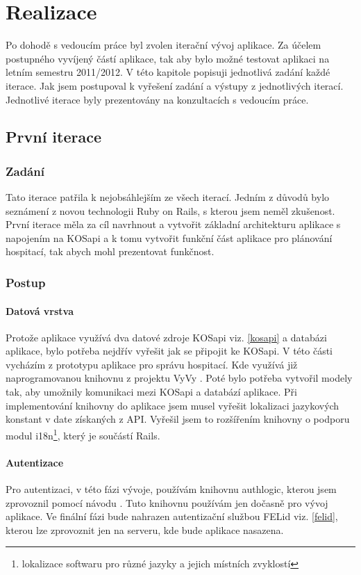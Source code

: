 \chapter{Realizace}
Po dohodě s vedoucím práce byl zvolen iterační vývoj aplikace. Za účelem postupného vyvíjený částí aplikace, tak aby bylo možné testovat aplikaci na letním semestru 2011/2012. V této kapitole popisuji jednotlivá zadání každé iterace. Jak jsem postupoval k vyřešení zadání a výstupy z jednotlivých iterací. Jednotlivé iterace byly prezentovány na konzultacích s vedoucím práce.

\section{První iterace}
\subsection{Zadání}
Tato iterace patřila k nejobsáhlejším ze všech iterací. Jedním z důvodů bylo  seznámení z novou technologii Ruby on Rails, s kterou jsem neměl zkušenost. První iterace měla za cíl navrhnout a vytvořit základní architekturu aplikace s napojením na KOSapi \cite{kosapi} a k tomu vytvořit funkční část aplikace pro plánování hospitací, tak abych mohl prezentovat funkčnost.

\subsection{Postup}
\subsubsection{Datová vrstva}
Protože aplikace využívá dva datové zdroje KOSapi viz. \ref{kosapi} a databázi aplikace, bylo potřeba nejdřív vyřešit jak se připojit ke KOSapi. V této části vycházím z prototypu aplikace pro správu hospitací. Kde využívá již naprogramovanou knihovnu z projektu VyVy \cite{vyvy}. Poté bylo potřeba vytvořil modely tak, aby umožnily komunikaci mezi KOSapi a databází aplikace. Při implementování knihovny do aplikace jsem musel vyřešit lokalizaci jazykových konstant v date získaných z API. Vyřešil jsem to rozšířením knihovny o podporu modul i18n\footnote{lokalizace softwaru pro různé jazyky a jejich místních zvyklostí}, který je součástí Rails.

\subsubsection{Autentizace}
Pro autentizaci, v této fázi vývoje, používám knihovnu authlogic, kterou jsem zprovoznil pomocí návodu \cite{authlogic}. Tuto knihovnu používám jen dočasně pro vývoj aplikace. Ve finální fázi bude nahrazen autentizační službou FELid viz. \ref{felid}, kterou lze zprovoznit jen na serveru, kde bude aplikace nasazena. 

